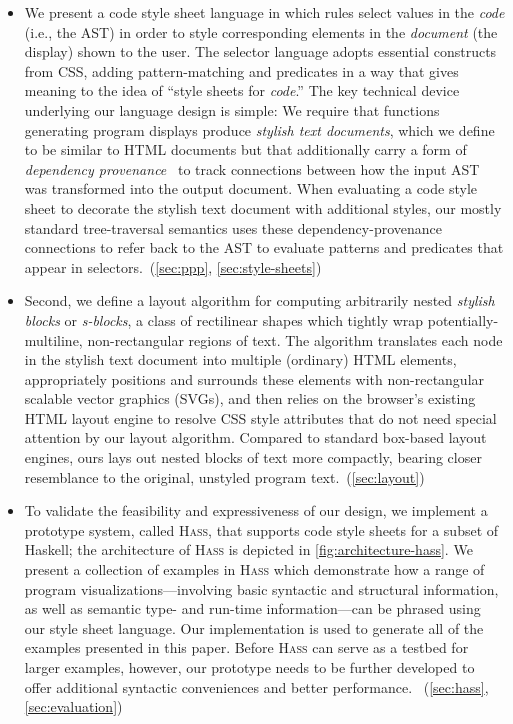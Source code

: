 \documentclass[acmsmall, screen]{acmart}
\newcommand{\hass}
{\textsc{Hass}}
\begin{document}
\begin{itemize}

\item
We present a code style sheet language in which rules select values in the \emph{code} (i.e., the AST) in order to style corresponding elements in the \emph{document} (the display) shown to the user.
The selector language adopts essential constructs from CSS, adding pattern-matching and predicates in a way that gives meaning to the idea of ``style sheets for \emph{code}.''
The key technical device underlying our language design is simple:
We require that functions generating program displays produce \emph{stylish text documents}, which we define to be similar to HTML documents but that additionally carry a form of \emph{dependency provenance}~\citep{TML} to track connections between how the input AST was transformed into the output document.
When evaluating a code style sheet to decorate the stylish text document with additional styles, our mostly standard tree-traversal semantics uses these dependency-provenance connections to refer back to the AST to evaluate patterns and predicates that appear in selectors.~(\autoref{sec:ppp}, \autoref{sec:style-sheets})

\item 
Second, we define a layout algorithm for computing arbitrarily nested \emph{stylish blocks} or \emph{s-blocks}, a class of rectilinear shapes which tightly wrap potentially-multiline, non-rectangular regions of text.
The algorithm translates each node in the stylish text document into multiple (ordinary) HTML elements,
appropriately positions and surrounds these elements with non-rectangular scalable vector graphics (SVGs),
and then relies on the browser's existing HTML layout engine to resolve CSS style attributes that do not need special attention by our layout algorithm.
Compared to standard box-based layout engines, ours lays out nested blocks of text more compactly, bearing closer resemblance to the original, unstyled program text.~(\autoref{sec:layout})



\item
To validate the feasibility and expressiveness of our design,
we implement a prototype system, called \hass{}, that supports code style sheets for a subset of Haskell;
the architecture of \hass{} is depicted in \autoref{fig:architecture-hass}.
We present a collection of examples in \hass{} which
demonstrate how a range of program visualizations---involving basic syntactic and structural information, as well as semantic type- and run-time information---can be phrased using our style sheet language.
Our implementation is used to generate all of the examples presented in this paper.
Before \hass{} can serve as a testbed for larger examples, however, our prototype needs to be further developed to offer additional syntactic conveniences and better performance.
~(\autoref{sec:hass}, \autoref{sec:evaluation})

\end{itemize}
\end{document}
